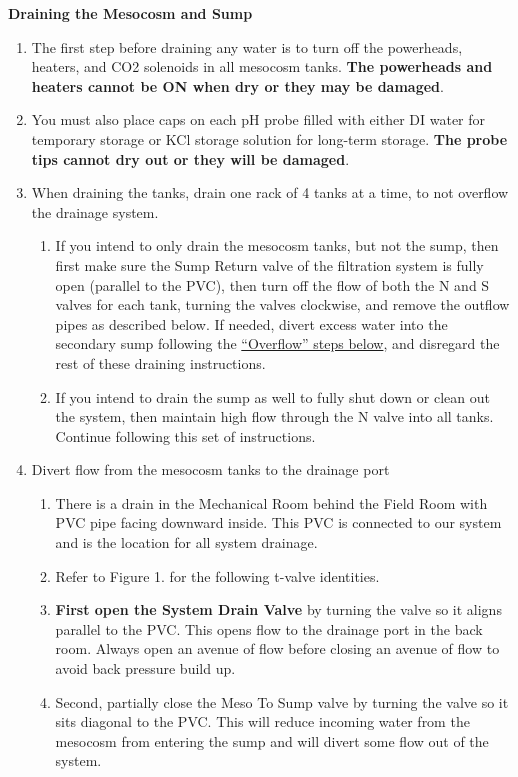 \documentclass[]{book}
\providecommand{\tightlist}{%
  \setlength{\itemsep}{0pt}\setlength{\parskip}{0pt}}
\begin{document}
 \textbf{Draining the Mesocosm and Sump}

\begin{enumerate}
\def\labelenumi{\arabic{enumi}.}
\tightlist
\item
  The first step before draining any water is to turn off the
  powerheads, heaters, and CO2 solenoids in all mesocosm tanks.
  \textbf{The powerheads and heaters cannot be ON when dry or they may
  be damaged}.
\item
  You must also place caps on each pH probe filled with either DI water
  for temporary storage or KCl storage solution for long-term storage.
  \textbf{The probe tips cannot dry out or they will be damaged}.
\item
  When draining the tanks, drain one rack of 4 tanks at a time, to not
  overflow the drainage system.

  \begin{enumerate}
  \def\labelenumii{\arabic{enumii}.}
  \tightlist
  \item
    If you intend to only drain the mesocosm tanks, but not the sump,
    then first make sure the Sump Return valve of the filtration system
    is fully open (parallel to the PVC), then turn off the flow of both
    the N and S valves for each tank, turning the valves clockwise, and
    remove the outflow pipes as described below. If needed, divert
    excess water into the secondary sump following the
    \protect\hyperlink{Overflow_into_Secondary_Sump}{``Overflow'' steps
    below}, and disregard the rest of these draining instructions.
  \item
    If you intend to drain the sump as well to fully shut down or clean
    out the system, then maintain high flow through the N valve into all
    tanks. Continue following this set of instructions.
  \end{enumerate}
\item
  Divert flow from the mesocosm tanks to the drainage port

  \begin{enumerate}
  \def\labelenumii{\arabic{enumii}.}
  \tightlist
  \item
    There is a drain in the Mechanical Room behind the Field Room with
    PVC pipe facing downward inside. This PVC is connected to our system
    and is the location for all system drainage.
  \item
    Refer to Figure 1. for the following t-valve identities.
  \item
    \textbf{First open the System Drain Valve} by turning the valve so
    it aligns parallel to the PVC. This opens flow to the drainage port
    in the back room. Always open an avenue of flow before closing an
    avenue of flow to avoid back pressure build up.
  \item
    Second, partially close the Meso To Sump valve by turning the valve
    so it sits diagonal to the PVC. This will reduce incoming water from
    the mesocosm from entering the sump and will divert some flow out of
    the system.


\end{enumerate}
\end{enumerate}
\end{document}
